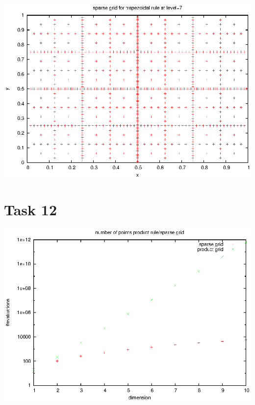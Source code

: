 \documentclass[]{article}
\begin{document}
\includegraphics[width=.9\textwidth]{task11_trap_7}\\

\section*{Task 12}
\includegraphics[width=.9\textwidth]{task12}\\
\end{document}
